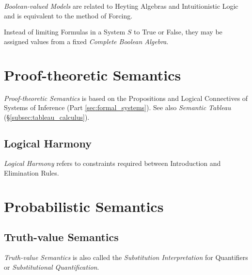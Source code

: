 \documentclass{article}
\begin{document}
\emph{Boolean-valued Models} are related to Heyting Algebras and
Intuitionistic Logic and is equivalent to the method of Forcing.

Instead of limiting Formulas in a System $S$ to True or False, they
may be assigned values from a fixed \emph{Complete Boolean Algebra}.



\section{Proof-theoretic Semantics}

\emph{Proof-theoretic Semantics} is based on the Propositions and
Logical Connectives of Systems of Inference (Part
\ref{sec:formal_systems}). See also \emph{Semantic Tableau}
(\S\ref{subsec:tableau_calculus}).

\subsection{Logical Harmony} \label{subsec:logical_harmony}

\emph{Logical Harmony} refers to constraints required between
Introduction and Elimination Rules.



\section{Probabilistic Semantics}

\subsection{Truth-value Semantics}

\emph{Truth-value Semantics} is also called the \emph{Substitution
  Interpretation} for Quantifiers or \emph{Substitutional
  Quantification}.
\end{document}
